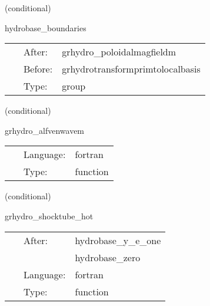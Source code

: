 \documentclass{article}
\begin{document}
\vspace{5mm}

   (conditional) 

\hspace{5mm} hydrobase\_boundaries 

\hspace{5mm}{\it call boundary conditions after magnetic field initial data setup } 


\hspace{5mm}

 \begin{tabular*}{160mm}{cll} 
~ & After:  & grhydro\_poloidalmagfieldm \\ 
~ & Before:  & grhydrotransformprimtolocalbasis \\ 
~ & Type:  & group \\ 
\end{tabular*} 


\vspace{5mm}

   (conditional) 

\hspace{5mm} grhydro\_alfvenwavem 

\hspace{5mm}{\it circularly polarized alfven wave initial data } 


\hspace{5mm}

 \begin{tabular*}{160mm}{cll} 
~ & Language:  & fortran \\ 
~ & Type:  & function \\ 
\end{tabular*} 


\vspace{5mm}

   (conditional) 

\hspace{5mm} grhydro\_shocktube\_hot 

\hspace{5mm}{\it hot shocktube initial data } 


\hspace{5mm}

 \begin{tabular*}{160mm}{cll} 
~ & After:  & hydrobase\_y\_e\_one \\ 
~& ~ &hydrobase\_zero\\ 
~ & Language:  & fortran \\ 
~ & Type:  & function \\ 
\end{tabular*} 
\end{document}
